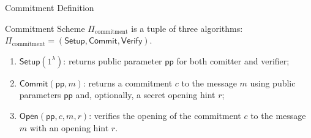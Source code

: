 \documentclass{zkdl-presentation-template}
\begin{document}
    \begin{frame}{Commitment Definition}
        \begin{definition}
            Commitment Scheme $\Pi_{\text{commitment}}$ is a tuple of three algorithms: $\Pi_{\text{commitment}} = (\mathsf{Setup}, \mathsf{Commit}, \mathsf{Verify})$.

            \begin{enumerate}

                \item $\mathsf{Setup} (1^{\lambda})$: returns public parameter $\mathsf{pp}$ for both comitter and verifier;
        
                \item  $\mathsf{Commit} (\mathsf{pp}, m)$: returns a commitment $c$ to the message $m$ using public parameters $\mathsf{pp}$ and, optionally, a secret opening hint $r$;
        
                \item  $\mathsf{Open} (\mathsf{pp}, c, m, r)$: verifies the opening of the commitment $c$ to the message $m$ with an opening hint $r$. 
            \end{enumerate}
        \end{definition}

    \end{frame}
\end{document}
